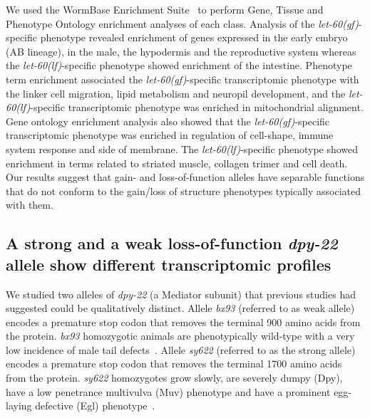 \documentclass[10pt, onecolumn]{article}
\newcommand{\gene}[1]{\mbox{\emph{#1}}}
\newcommand{\letgf}{\gene{let-60(gf)}}
\newcommand{\letlf}{\gene{let-60(lf)}}
\begin{document}
We used the WormBase Enrichment Suite~\cite{Angeles-Albores2016} to perform
Gene, Tissue and Phenotype Ontology enrichment analyses of each class. Analysis
of the \letgf{}-specific phenotype revealed enrichment of genes expressed in the
early embryo (AB lineage), in the male, the hypodermis and the reproductive
system whereas the \letlf{}-specific phenotype showed enrichment of the
intestine. Phenotype term enrichment associated the \letgf{}-specific
transcriptomic phenotype with the linker cell migration, lipid metabolism and
neuropil development, and the \letlf{}-specific transcriptomic phenotype was
enriched in mitochondrial alignment. Gene ontology enrichment analysis also
showed that the \letgf{}-specific transcriptomic phenotype was enriched in
regulation of cell-shape, immune system response and side of membrane. The
\letlf{}-specific phenotype showed enrichment in terms related to striated
muscle, collagen trimer and cell death. Our results suggest that gain- and
loss-of-function alleles have separable functions that do not conform to the
gain/loss of structure phenotypes typically associated with them.

\subsection*{A strong and a weak loss-of-function \gene{dpy-22} allele show
             different transcriptomic profiles}
We studied two alleles of \gene{dpy-22} (a Mediator subunit) that previous
studies had suggested could be qualitatively distinct. Allele \emph{bx93}
(referred to as weak allele) encodes a premature stop codon that removes the
terminal 900 amino acids from the protein. \emph{bx93} homozygotic animals are
phenotypically wild-type with a very low incidence of male tail defects~\cite{}.
Allele \emph{sy622} (referred to as the strong allele) encodes a premature stop
codon that removes the terminal 1700 amino acids from the protein. \emph{sy622}
homozygotes grow slowly, are severely dumpy (Dpy), have a low penetrance
multivulva (Muv) phenotype and have a prominent egg-laying defective (Egl)
phenotype~\cite{Moghal2003}.
\end{document}
